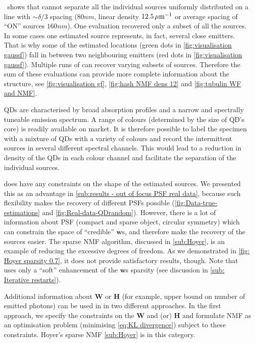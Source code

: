 \ccc\ shows that \inmf{} cannot separate all the individual sources uniformly distributed on a line with $\sim \delta/3$ spacing ($80 \unit{nm}$, linear density $12.5 \, \mathrm{\mu m}^{-1}$ or average spacing of ``ON'' sources $160 \unit{nm}$). One \inmf{} evaluation recovered only a subset of all the sources. In some cases one \inmf{} estimated source represents, in fact, several close emitters. That is why some of the estimated locations (green dots in \autoref{fig:visualisation gaussf}\bbb) fall in between two neighbouring emitters (red dots in \autoref{fig:visualisation gaussf}\bbb). Multiple runs of \inmf{} can recover varying subsets of sources. 
Therefore the sum of these evaluations can provide more complete information about the structure, see \autoref{fig:visualisation gf}, \ref{fig:hash NMF dens 12} and \ref{fig:tubulin WF and NMF}. 


QDs are characterised by broad absorption profiles and a narrow and spectrally tuneable emission spectrum. A range of colours (determined by the size of QD's core) is readily available on market. It is therefore possible to label the specimen with a mixture of QDs with a variety of colours and record the intermittent sources in several different spectral channels. This would lead to a reduction in density of the QDs in each colour channel and facilitate the separation of the individual sources. 

\inmf{} does have any constraints on the shape of the estimated sources. We presented this as an advantage in \autoref{sub:results - out of focus PSF real data}, because such flexibility makes the recovery of different PSFs possible (\autoref{fig:Data-true-estimations} and \ref{fig:Real-data-QDrandom}\bbb). However, there is a lot of information about PSF (compact and sparse object, circular symmetry) which can constrain the space of ``credible'' $\bm{w}$s, and therefore make the recovery of the sources easier. The sparse NMF algorithm, discussed in \autoref{sub:Hoyer}, is an example of reducing the excessive degrees of freedom. As we demonstrated in \autoref{fig: Hoyer sparsity 0.7}, it does not provide satisfactory results, though. Note that \inmf{} uses only a ``soft'' enhancement of the $\bm{w}$s sparsity  (see discussion in \autoref{sub: Iterative restarts}). 

Additional information about $\bm{W}$ or $\bm{H}$ (for example, upper bound on number of emitted photons) can be used in in two different approaches. In the first approach, we specify the constraints on the $\bm{W}$ and (or) $\bm{H}$ and formulate NMF as an optimisation problem (minimising \autoref{eq:KL divergence}) subject to these constraints. Hoyer's sparse NMF \autoref{sub:Hoyer} is in this category. 

